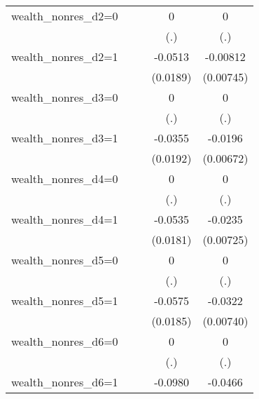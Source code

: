 \begin{table}[htbp]
\begin{tabular}{l*{4}{c}}
wealth\_nonres\_d2=0&                  &                  &        0         &        0         \\
                &                  &                  &      (.)         &      (.)         \\
wealth\_nonres\_d2=1&                  &                  &  -0.0513\sym{***}& -0.00812         \\
                &                  &                  & (0.0189)         &(0.00745)         \\
wealth\_nonres\_d3=0&                  &                  &        0         &        0         \\
                &                  &                  &      (.)         &      (.)         \\
wealth\_nonres\_d3=1&                  &                  &  -0.0355\sym{*}  &  -0.0196\sym{***}\\
                &                  &                  & (0.0192)         &(0.00672)         \\
wealth\_nonres\_d4=0&                  &                  &        0         &        0         \\
                &                  &                  &      (.)         &      (.)         \\
wealth\_nonres\_d4=1&                  &                  &  -0.0535\sym{***}&  -0.0235\sym{***}\\
                &                  &                  & (0.0181)         &(0.00725)         \\
wealth\_nonres\_d5=0&                  &                  &        0         &        0         \\
                &                  &                  &      (.)         &      (.)         \\
wealth\_nonres\_d5=1&                  &                  &  -0.0575\sym{***}&  -0.0322\sym{***}\\
                &                  &                  & (0.0185)         &(0.00740)         \\
wealth\_nonres\_d6=0&                  &                  &        0         &        0         \\
                &                  &                  &      (.)         &      (.)         \\
wealth\_nonres\_d6=1&                  &                  &  -0.0980\sym{***}&  -0.0466\sym{***}\\

\end{tabular}
\end{table}

